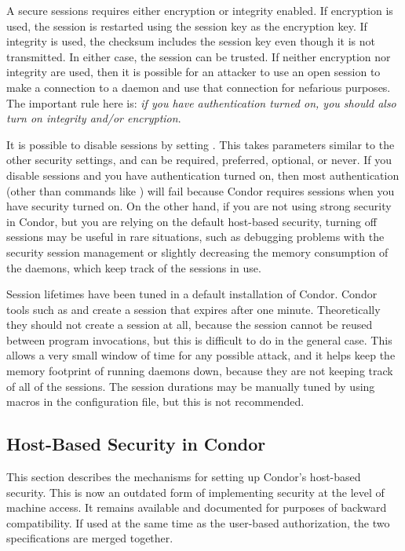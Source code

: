 A secure sessions requires either encryption or integrity enabled. 
If encryption is used, the session is restarted using the session key
as the encryption key. 
If integrity is used, the checksum includes the session key even
though it is not transmitted. 
In either case, the session can be trusted. 
If neither encryption nor integrity are used,
then it is possible for an
attacker to use an open session to make a connection to a daemon and
use that connection for nefarious purposes. 
The important rule here is: \emph{if you have authentication turned
on, you should also turn on integrity and/or encryption}. 

It is possible to disable sessions by setting
. This takes parameters similar to
the other security settings, and can be required, preferred, optional,
or never. 
If you disable sessions and you have authentication turned
on, then most authentication (other than commands like
) will fail because Condor requires sessions when you
have security turned on. 
On the other hand, if you are not using strong security in Condor, but
you are relying on the default host-based security, turning off
sessions may be useful in rare situations, such as debugging problems
with the security session management or slightly decreasing the memory
consumption of the daemons, which keep track of the sessions in use. 

Session lifetimes have been tuned in a default installation
of Condor.  
Condor tools such as  and  create a
session that expires after one minute. 
Theoretically they should not create a session at all,
because the
session cannot be reused between program invocations, but this is
difficult to do in the general case.
This allows a very small window of time for any possible attack,
and it helps
keep the memory footprint of running daemons down,
because they are not keeping track of all of the sessions.
The session durations may be manually tuned
by using macros in the configuration file,
but this is not recommended.


\subsection{\label{sec:Host-Security}Host-Based Security in
Condor} 

This section describes the mechanisms for setting up Condor's
host-based security.  
This is now an outdated form of implementing security at
the level of machine access. 
It remains available and documented for purposes of backward compatibility.
If used at the same time as the user-based authorization,
the two specifications are merged together.

